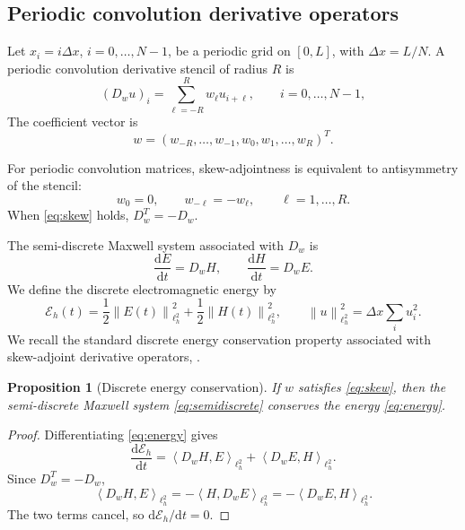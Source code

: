 \documentclass[11pt]{article}
\newtheorem{proposition}[theorem]{Proposition}
\numberwithin{equation}{section}
\numberwithin{figure}{section}
\numberwithin{table}{section}
\newcommand{\dd}{\mathrm{d}}
\newcommand{\dx}{\Delta x}
\newcommand{\Eh}{\mathcal E_h}
\newcommand{\norm}[2]{\left\|#1\right\|_{#2}}
\newcommand{\inner}[2]{\left\langle #1,#2\right\rangle}
\begin{document}
\subsection{Periodic convolution derivative operators}

Let $x_i=i\dx$, $i=0,\ldots,N-1$, be a periodic grid on $[0,L]$, with
$\dx=L/N$. A periodic convolution derivative stencil of radius $R$ is
\begin{equation}
  (D_w u)_i = \sum_{\ell=-R}^{R} w_\ell u_{i+\ell},
  \qquad i=0,\ldots,N-1,
  \label{eq:stencil}
\end{equation}
The coefficient vector is
\[
  w = (w_{-R},\ldots,w_{-1},w_0,w_1,\ldots,w_R)^T.
\]

For periodic convolution matrices, skew-adjointness is equivalent to
antisymmetry of the stencil:
\begin{equation}
  w_0=0,\qquad w_{-\ell}=-w_\ell,\qquad \ell=1,\ldots,R.
  \label{eq:skew}
\end{equation}
When \eqref{eq:skew} holds, $D_w^T=-D_w$.

The semi-discrete Maxwell system associated with $D_w$ is
\begin{equation}
  \frac{\dd E}{\dd t}=D_wH,
  \qquad
  \frac{\dd H}{\dd t}=D_wE.
  \label{eq:semidiscrete}
\end{equation}
We define the discrete electromagnetic energy by
\begin{equation}
  \Eh(t)=
  \frac12\norm{E(t)}{\ell^2_h}^2
  +
  \frac12\norm{H(t)}{\ell^2_h}^2,
  \qquad
  \norm{u}{\ell^2_h}^2=\dx\sum_i u_i^2.
  \label{eq:energy}
\end{equation}
We recall the standard discrete energy conservation property associated
with skew-adjoint derivative operators, \cite{bokil2014operator,obieke2025structurepreservingphysicsinformedneuralnetwork}.
\begin{proposition}[Discrete energy conservation]
If $w$ satisfies \eqref{eq:skew}, then the semi-discrete Maxwell system
\eqref{eq:semidiscrete} conserves the energy \eqref{eq:energy}.
\end{proposition}

\begin{proof}
Differentiating \eqref{eq:energy} gives
\[
  \frac{\dd \Eh}{\dd t}
  =
  \inner{D_wH}{E}_{\ell^2_h}
  +
  \inner{D_wE}{H}_{\ell^2_h}.
\]
Since $D_w^T=-D_w$,
\[
  \inner{D_wH}{E}_{\ell^2_h}
  =
  -\inner{H}{D_wE}_{\ell^2_h}
  =
  -\inner{D_wE}{H}_{\ell^2_h}.
\]
The two terms cancel, so $\dd\Eh/\dd t=0$.
\end{proof}
\end{document}
